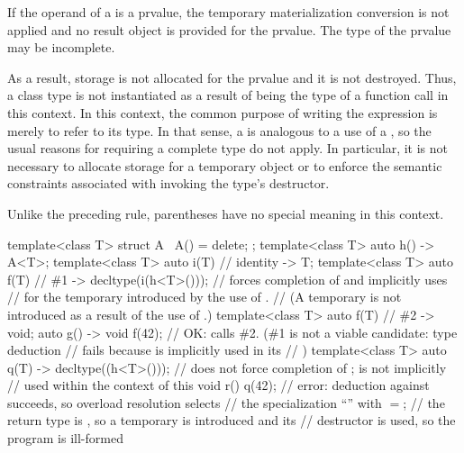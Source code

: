 \pnum
If the operand of a  is a prvalue,
the temporary materialization conversion is not applied
and no result object is provided for the prvalue.
The type of the prvalue may be incomplete.
\begin{note}
As a result, storage is not allocated for the prvalue and it is not destroyed.
Thus, a class type is not instantiated
as a result of being the type of a function call in this context.
In this context, the common purpose of
writing the expression is merely to refer to its type. In that sense, a
 is analogous to a use of a ,
so the usual reasons for requiring a complete type do not apply. In particular,
it is not necessary to allocate storage for a temporary object or to enforce the
semantic constraints associated with invoking the type's destructor.
\end{note}
\begin{note}
Unlike the preceding rule, parentheses have no special meaning in this context.
\end{note}
\begin{example}
\begin{codeblock}
template<class T> struct A { ~A() = delete; };
template<class T> auto h()
  -> A<T>;
template<class T> auto i(T)     // identity
  -> T;
template<class T> auto f(T)     // \#1
  -> decltype(i(h<T>()));       // forces completion of  and implicitly uses 
                                // for the temporary introduced by the use of .
                                // (A temporary is not introduced as a result of the use of .)
template<class T> auto f(T)     // \#2
  -> void;
auto g() -> void {
  f(42);                        // OK: calls \#2. (\#1 is not a viable candidate: type deduction
                                // fails because  is implicitly used in its
                                // )
}
template<class T> auto q(T)
  -> decltype((h<T>()));        // does not force completion of ;  is not implicitly
                                // used within the context of this 
void r() {
  q(42);                        // error: deduction against  succeeds, so overload resolution selects
                                // the specialization ``'' with $=$;
                                // the return type is , so a temporary is introduced and its
                                // destructor is used, so the program is ill-formed
}
\end{codeblock}
\end{example}

